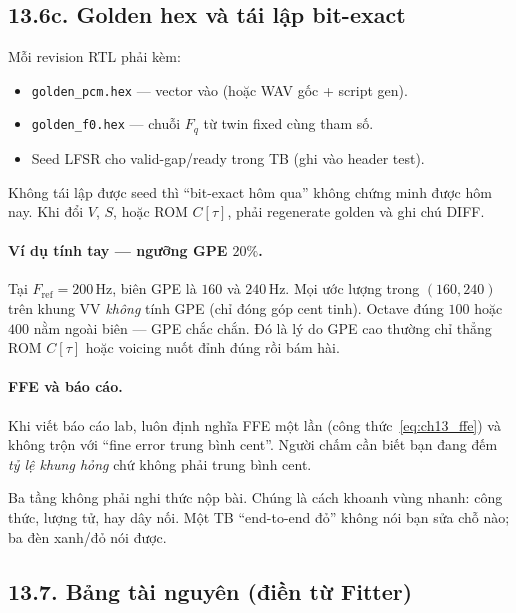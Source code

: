 \subsection*{13.6c. Golden hex và tái lập bit-exact}

Mỗi revision RTL phải kèm:
\begin{itemize}[leftmargin=1.4em]
  \item \texttt{golden\_pcm.hex} --- vector vào (hoặc WAV gốc + script gen).
  \item \texttt{golden\_f0.hex} --- chuỗi $F_q$ từ twin fixed cùng tham số.
  \item Seed LFSR cho valid-gap/ready trong TB (ghi vào header test).
\end{itemize}
Không tái lập được seed thì ``bit-exact hôm qua'' không chứng minh được hôm nay. Khi đổi $V$, $S$, hoặc ROM $C[\tau]$, phải regenerate golden và ghi chú DIFF.

\paragraph{Ví dụ tính tay --- ngưỡng GPE $20\%$.}
Tại $F_{\mathrm{ref}}=200\,\text{Hz}$, biên GPE là $160$ và $240\,\text{Hz}$. Mọi ước lượng trong $(160,240)$ trên khung VV \emph{không} tính GPE (chỉ đóng góp cent tinh). Octave đúng $100$ hoặc $400$ nằm ngoài biên --- GPE chắc chắn. Đó là lý do GPE cao thường chỉ thẳng ROM $C[\tau]$ hoặc voicing nuốt đỉnh đúng rồi bám hài.

\paragraph{FFE và báo cáo.} Khi viết báo cáo lab, luôn định nghĩa FFE một lần (công thức~\eqref{eq:ch13_ffe}) và không trộn với ``fine error trung bình cent''. Người chấm cần biết bạn đang đếm \emph{tỷ lệ khung hỏng} chứ không phải trung bình cent.

\begin{physicalinsight}
Ba tầng không phải nghi thức nộp bài. Chúng là cách khoanh vùng nhanh: công thức, lượng tử, hay dây nối. Một TB ``end-to-end đỏ'' không nói bạn sửa chỗ nào; ba đèn xanh/đỏ nói được.
\end{physicalinsight}

\subsection*{13.7. Bảng tài nguyên (điền từ Fitter)}

